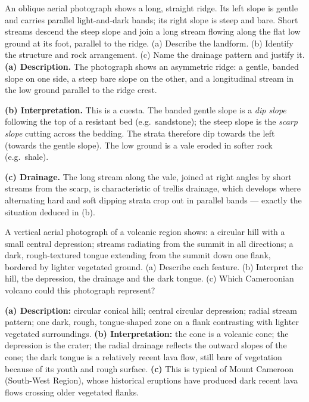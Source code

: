 \documentclass[11pt]{article}
\newcommand{\cle}[1]{{\popxbold\color{popdark}#1}}
\begin{document}
\begin{exoresolu}
An oblique aerial photograph shows a long, straight ridge. Its left slope is gentle and carries parallel light-and-dark bands; its right slope is steep and bare. Short streams descend the steep slope and join a long stream flowing along the flat low ground at its foot, parallel to the ridge. (a) Describe the landform. (b) Identify the structure and rock arrangement. (c) Name the drainage pattern and justify it.
\tcblower
\textbf{(a) Description.} The photograph shows an asymmetric ridge: a gentle, banded slope on one side, a steep bare slope on the other, and a longitudinal stream in the low ground parallel to the ridge crest.

\textbf{(b) Interpretation.} This is a \cle{cuesta}. The banded gentle slope is a \emph{dip slope} following the top of a resistant bed (e.g.\ sandstone); the steep slope is the \emph{scarp slope} cutting across the bedding. The strata therefore dip towards the left (towards the gentle slope). The low ground is a vale eroded in softer rock (e.g.\ shale).

\textbf{(c) Drainage.} The long stream along the vale, joined at right angles by short streams from the scarp, is characteristic of \cle{trellis drainage}, which develops where alternating hard and soft dipping strata crop out in parallel bands — exactly the situation deduced in (b).
\end{exoresolu}

\begin{exercice}
A vertical aerial photograph of a volcanic region shows: a circular hill with a small central depression; streams radiating from the summit in all directions; a dark, rough-textured tongue extending from the summit down one flank, bordered by lighter vegetated ground. (a) Describe each feature. (b) Interpret the hill, the depression, the drainage and the dark tongue. (c) Which Cameroonian volcano could this photograph represent?
\end{exercice}

\begin{corrige}[Exercise 1]
\textbf{(a) Description:} circular conical hill; central circular depression; radial stream pattern; one dark, rough, tongue-shaped zone on a flank contrasting with lighter vegetated surroundings.
\textbf{(b) Interpretation:} the cone is a \cle{volcanic cone}; the depression is the \cle{crater}; the radial drainage reflects the outward slopes of the cone; the dark tongue is a relatively recent \cle{lava flow}, still bare of vegetation because of its youth and rough surface.
\textbf{(c)} This is typical of \cle{Mount Cameroon} (South-West Region), whose historical eruptions have produced dark recent lava flows crossing older vegetated flanks.
\end{corrige}
\end{document}
